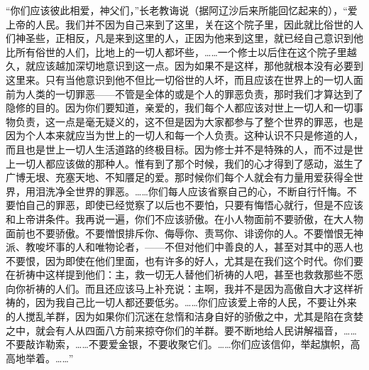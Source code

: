 \par “你们应该彼此相爱，神父们，”长老教诲说（据阿辽沙后来所能回忆起来的），“爱上帝的人民。我们并不因为自己来到了这里，关在这个院子里，因此就比俗世的人们神圣些，正相反，凡是来到这里的人，正因为他来到这里，就已经自己意识到他比所有俗世的人们，比地上的一切人都坏些，……一个修士以后住在这个院子里越久，就应该越加深切地意识到这一点。因为如果不是这样，那他就根本没有必要到这里来。只有当他意识到他不但比一切俗世的人坏，而且应该在世界上的一切人面前为人类的一切罪恶——不管是全体的或是个人的罪恶负责，那时我们才算达到了隐修的目的。因为你们要知道，亲爱的，我们每个人都应该对世上一切人和一切事物负责，这一点是毫无疑义的，这不但是因为大家都参与了整个世界的罪恶，也是因为个人本来就应当为世上的一切人和每一个人负责。这种认识不只是修道的人，而且也是世上一切人生活道路的终极目标。因为修士并不是特殊的人，而不过是世上一切人都应该做的那种人。惟有到了那个时候，我们的心才得到了感动，滋生了广博无垠、充塞天地、不知餍足的爱。那时候你们每个人就会有力量用爱获得全世界，用泪洗净全世界的罪恶。……你们每人应该省察自己的心，不断自行忏悔。不要怕自己的罪恶，即使已经觉察了以后也不要怕，只要有悔悟心就行，但是不应该和上帝讲条件。我再说一遍，你们不应该骄傲。在小人物面前不要骄傲，在大人物面前也不要骄傲。不要憎恨排斥你、侮辱你、责骂你、诽谤你的人。不要憎恨无神派、教唆坏事的人和唯物论者，——不但对他们中善良的人，甚至对其中的恶人也不要恨，因为即使在他们里面，也有许多的好人，尤其是在我们这个时代。你们要在祈祷中这样提到他们：主，救一切无人替他们祈祷的人吧，甚至也救救那些不愿向你祈祷的人们。而且还应该马上补充说：主啊，我并不是因为高傲自大才这样祈祷的，因为我自己比一切人都还要低劣。……你们应该爱上帝的人民，不要让外来的人搅乱羊群，因为如果你们沉迷在怠惰和洁身自好的骄傲之中，尤其是陷在贪婪之中，就会有人从四面八方前来掠夺你们的羊群。要不断地给人民讲解福音，……不要敲诈勒索，……不要爱金银，不要收聚它们。……你们应该信仰，举起旗帜，高高地举着。……”
